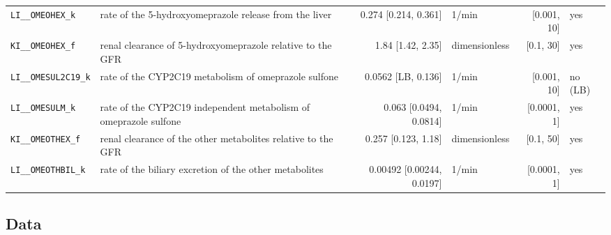 \documentclass{article}
\begin{document}
\begin{longtable}{llrlrl}
\texttt{LI\_\_OMEOHEX\_k} & rate of the 5-hydroxyomeprazole release from the liver & 0.274 [0.214, 0.361] & 1/min & [0.001, 10] & yes \\
\texttt{KI\_\_OMEOHEX\_f} & renal clearance of 5-hydroxyomeprazole relative to the GFR & 1.84 [1.42, 2.35] & dimensionless & [0.1, 30] & yes \\
\texttt{LI\_\_OMESUL2C19\_k} & rate of the CYP2C19 metabolism of omeprazole sulfone & 0.0562 [LB, 0.136] & 1/min & [0.001, 10] & no (LB) \\
\texttt{LI\_\_OMESULM\_k} & rate of the CYP2C19 independent metabolism of omeprazole sulfone & 0.063 [0.0494, 0.0814] & 1/min & [0.0001, 1] & yes \\
\texttt{KI\_\_OMEOTHEX\_f} & renal clearance of the other metabolites relative to the GFR & 0.257 [0.123, 1.18] & dimensionless & [0.1, 50] & yes \\
\texttt{LI\_\_OMEOTHBIL\_k} & rate of the biliary excretion of the other metabolites & 0.00492 [0.00244, 0.0197] & 1/min & [0.0001, 1] & yes \\
\end{longtable}

\subsection{Data}
\end{document}
